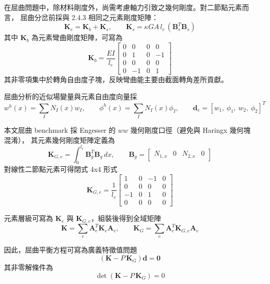 ﻿\documentclass[UTF8, a4paper, 12pt]{ctexart}
\begin{document}
在屈曲問題中，除材料剛度外，尚需考慮軸力引致之幾何剛度。對二節點元素而言，
屈曲分岔前採與 2.4.3 相同之元素剛度矩陣：
\begin{equation}
  \mathbf{K}_e=\mathbf{K}_b+\mathbf{K}_s,\qquad
  \mathbf{K}_s=\kappa GA\,l_e\,(\mathbf{B}_s^T\mathbf{B}_s)
\end{equation}
其中 $\mathbf{K}_b$ 為元素彎曲剛度矩陣，可寫為
\begin{equation}
  \mathbf{K}_b=\frac{EI}{l_e}
  \begin{bmatrix}
    0&0&0&0\\
    0&1&0&-1\\
    0&0&0&0\\
    0&-1&0&1
  \end{bmatrix}
\end{equation}
其非零項集中於轉角自由度子塊，反映彎曲能主要由截面轉角差所貢獻。

屈曲分析的近似場變量與元素自由度向量採
\begin{equation}
  w^h(x)=\sum_I N_I(x)w_I,\qquad
  \phi^h(x)=\sum_I N_I(x)\phi_I,\qquad
  \mathbf{d}_e=[w_1,\ \phi_1,\ w_2,\ \phi_2]^T
\end{equation}

本文屈曲 benchmark 採 Engesser 的 $ww$ 幾何剛度口徑（避免與 Haringx 幾何塊混淆），
其元素幾何剛度矩陣定義為
\begin{equation}
  \mathbf{K}_{G,e}=\int_0^{l_e}\mathbf{B}_g^T\mathbf{B}_g\,dx,\qquad
  \mathbf{B}_g=\begin{bmatrix}N_{1,x}&0&N_{2,x}&0\end{bmatrix}
\end{equation}
對線性二節點元素可得閉式 4x4 形式
\begin{equation}
  \mathbf{K}_{G,e}=\frac{1}{l_e}
  \begin{bmatrix}
    1&0&-1&0\\
    0&0&0&0\\
    -1&0&1&0\\
    0&0&0&0
  \end{bmatrix}
\end{equation}

元素層級可寫為 $\mathbf{K}_e$ 與 $\mathbf{K}_{G,e}$，組裝後得到全域矩陣
\begin{equation}
  \mathbf{K}=\sum_{e}\mathbf{A}_e^{T}\mathbf{K}_e\mathbf{A}_e,\qquad
  \mathbf{K}_G=\sum_{e}\mathbf{A}_e^{T}\mathbf{K}_{G,e}\mathbf{A}_e
\end{equation}

因此，屈曲平衡方程可寫為廣義特徵值問題
\begin{equation}
  \left(\mathbf{K}-P\,\mathbf{K}_G\right)\mathbf{d}=\mathbf{0}
\end{equation}
其非零解條件為
\begin{equation}
  \det\!\left(\mathbf{K}-P\,\mathbf{K}_G\right)=0
\end{equation}
\end{document}
